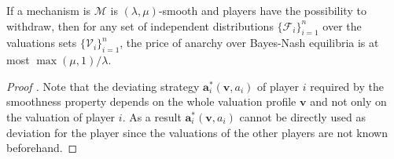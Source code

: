 \begin{theorem}
  \label{thm:upbound}
  If a mechanism is $ \mathcal{M} $ is $ (\lambda, \mu) $-smooth and players have the possibility to withdraw, then for any set of independent distributions $ \{\mathcal{F}_i\}_{i = 1}^{n} $ over the valuations sets $ \{\mathcal{V}_i\}_{i = 1}^{n} $, the price of anarchy over Bayes-Nash equilibria is at most $ \max(\mu, 1) /\lambda $.
\end{theorem}
\begin{proof}[Proof \cite{Syrgkanis2013Composable}]
  Note that the deviating strategy $ \mathbf{a}_i^{*}(\mathbf{v}, a_i) $ of player $ i $ required by the smoothness property depends on the whole valuation profile $ \mathbf{v} $ and not only on the valuation of player $ i $. As a result $ \mathbf{a}_i^*(\mathbf{v}, a_i) $ cannot be directly used as deviation for the player since the valuations of the other players are not known beforehand.



\end{proof}
